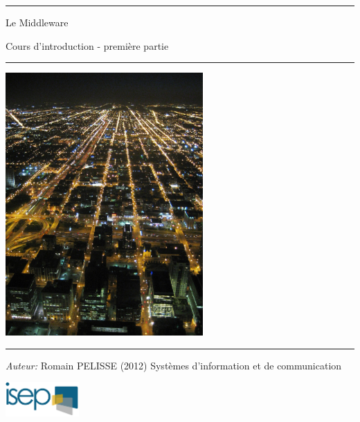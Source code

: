 \begin{titlepage}


\begin{center}
\vspace{20pt}
\hrule
\vspace{12pt}

\begin{center}
{ \huge Le Middleware}
\end{center}

\vspace{10pt}

\begin{center}
{ \Large Cours d'introduction - première partie}
\end{center}
\vspace{3pt}
\hrule
\vspace{12pt}
\begin{center}
 \includegraphics[height=380px]{../img/cover-chicago-by-night.jpg}
\end{center}
\vfill
\hrule
\vspace{10pt}

\begin{minipage}{0.7\textwidth}
\begin{flushleft} \large
\emph{Auteur:} Romain PELISSE (2012)
\newline
Systèmes d'information et de communication
\end{flushleft}
\end{minipage}
\begin{minipage}{0.2\textwidth}
\begin{flushright} \large
  \includegraphics[height=50px]{../img/isep-logo.png}
\end{flushright}
\end{minipage}
\end{center}
\end{titlepage}
